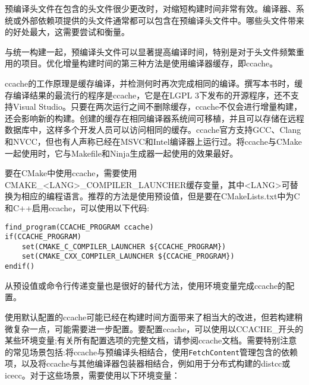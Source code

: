 预编译头文件在包含的头文件很少更改时，对缩短构建时间非常有效。编译器、系统或外部依赖项提供的头文件通常都可以包含在预编译头文件中。哪些头文件带来的好处最大，这需要尝试和衡量。

与统一构建一起，预编译头文件可以显著提高编译时间，特别是对于头文件频繁重用的项目。优化增量构建时间的第三种方法是使用编译器缓存，即ccache。


ccache的工作原理是缓存编译，并检测何时再次完成相同的编译。撰写本书时，缓存编译结果的最流行的程序是ccache，它是在LGPL 3下发布的开源程序，还不支持Visual Studio。只要在两次运行之间不删除缓存，ccache不仅会进行增量构建，还会影响新的构建。创建的缓存在相同编译器系统间可移植，并且可以存储在远程数据库中，这样多个开发人员可以访问相同的缓存。ccache官方支持GCC、Clang和NVCC，但也有人声称已经在MSVC和Intel编译器上运行过。将ccache与CMake一起使用时，它与Makefile和Ninja生成器一起使用的效果最好。

要在CMake中使用ccache，需要使用CMAKE\_<LANG>\_COMPILER\_LAUNCHER缓存变量，其中<LANG>可替换为相应的编程语言。推荐的方法是使用预设值，但是要在CMakeLists.txt中为C和C++启用ccache，可以使用以下代码:

\begin{lstlisting}[style=styleCMake]
find_program(CCACHE_PROGRAM ccache)
if(CCACHE_PROGRAM)
	set(CMAKE_C_COMPILER_LAUNCHER ${CCACHE_PROGRAM})
	set(CMAKE_CXX_COMPILER_LAUNCHER ${CCACHE_PROGRAM})
endif()
\end{lstlisting}

从预设值或命令行传递变量也是很好的替代方法，使用环境变量完成ccache的配置。

使用默认配置的ccache可能已经在构建时间方面带来了相当大的改进，但若构建稍微复杂一点，可能需要进一步配置。要配置ccache，可以使用以CCACHE\_开头的某些环境变量;有关所有配置选项的完整文档，请参阅ccache文档。需要特别注意的常见场景包括:将ccache与预编译头相结合，使用\texttt{FetchContent}管理包含的依赖项，以及将ccache与其他编译器包装器相结合，例如用于分布式构建的distcc或icecc。对于这些场景，需要使用以下环境变量：

